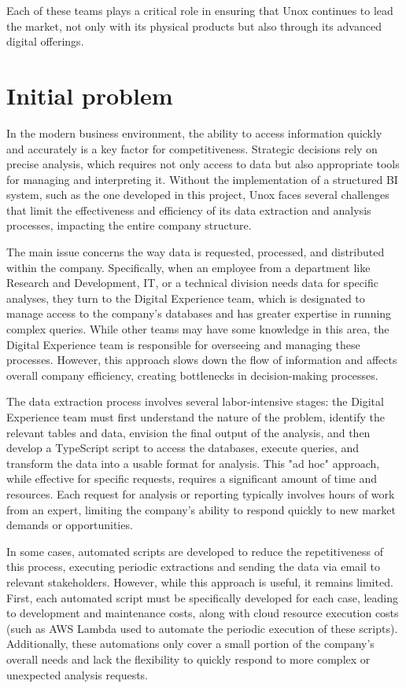 Each of these teams plays a critical role in ensuring that Unox continues to lead the market, not only with its physical products but also through its advanced digital offerings.

\section{Initial problem}

In the modern business environment, the ability to access information quickly and accurately is a key factor for competitiveness. Strategic decisions rely on precise analysis, which requires not only access to data but also appropriate tools for managing and interpreting it. Without the implementation of a structured \ac{BI} system, such as the one developed in this project, Unox faces several challenges that limit the effectiveness and efficiency of its data extraction and analysis processes, impacting the entire company structure.

The main issue concerns the way data is requested, processed, and distributed within the company. Specifically, when an employee from a department like Research and Development, IT, or a technical division needs data for specific analyses, they turn to the Digital Experience team, which is designated to manage access to the company’s databases and has greater expertise in running complex queries. While other teams may have some knowledge in this area, the Digital Experience team is responsible for overseeing and managing these processes. However, this approach slows down the flow of information and affects overall company efficiency, creating bottlenecks in decision-making processes.

The data extraction process involves several labor-intensive stages: the Digital Experience team must first understand the nature of the problem, identify the relevant tables and data, envision the final output of the analysis, and then develop a TypeScript script to access the databases, execute queries, and transform the data into a usable format for analysis. This "ad hoc" approach, while effective for specific requests, requires a significant amount of time and resources. Each request for analysis or reporting typically involves hours of work from an expert, limiting the company’s ability to respond quickly to new market demands or opportunities.

In some cases, automated scripts are developed to reduce the repetitiveness of this process, executing periodic extractions and sending the data via email to relevant stakeholders. However, while this approach is useful, it remains limited. First, each automated script must be specifically developed for each case, leading to development and maintenance costs, along with cloud resource execution costs (such as \ac{AWS} Lambda used to automate the periodic execution of these scripts). Additionally, these automations only cover a small portion of the company's overall needs and lack the flexibility to quickly respond to more complex or unexpected analysis requests.

